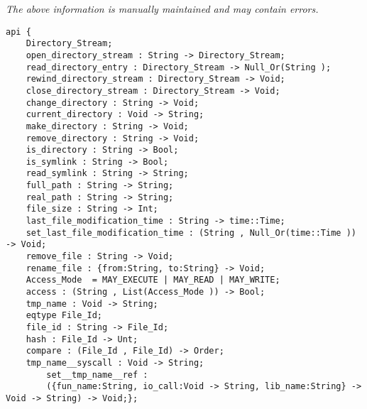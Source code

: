 \label{api:Winix\_File}

{\tiny \it The above information is manually maintained and may contain errors.}
\begin{verbatim}
api {
    Directory_Stream;
    open_directory_stream : String -> Directory_Stream;
    read_directory_entry : Directory_Stream -> Null_Or(String );
    rewind_directory_stream : Directory_Stream -> Void;
    close_directory_stream : Directory_Stream -> Void;
    change_directory : String -> Void;
    current_directory : Void -> String;
    make_directory : String -> Void;
    remove_directory : String -> Void;
    is_directory : String -> Bool;
    is_symlink : String -> Bool;
    read_symlink : String -> String;
    full_path : String -> String;
    real_path : String -> String;
    file_size : String -> Int;
    last_file_modification_time : String -> time::Time;
    set_last_file_modification_time : (String , Null_Or(time::Time )) -> Void;
    remove_file : String -> Void;
    rename_file : {from:String, to:String} -> Void;
    Access_Mode  = MAY_EXECUTE | MAY_READ | MAY_WRITE;
    access : (String , List(Access_Mode )) -> Bool;
    tmp_name : Void -> String;
    eqtype File_Id;
    file_id : String -> File_Id;
    hash : File_Id -> Unt;
    compare : (File_Id , File_Id) -> Order;
    tmp_name__syscall : Void -> String;
        set__tmp_name__ref :
        ({fun_name:String, io_call:Void -> String, lib_name:String} -> Void -> String) -> Void;};
\end{verbatim}
